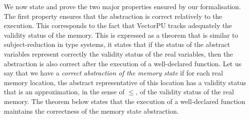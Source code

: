 \documentclass[preprint,12pt]{elsarticle}
\begin{document}
We now state and  prove the two major properties ensured by our formalisation.
The first property ensures that the abstraction is correct relatively to the 
execution. This corresponds to the fact that VectorPU tracks adequately the validity 
status of the 
memory. This is expressed as a theorem that is similar to subject-reduction in type 
systems, it states that if the status of the abstract variables represent correctly the 
validity status of the real variables, then the 
abstraction is also correct after the execution of a  well-declared function.  Let us say 
that  we have a \emph{correct abstraction of the memory state} if for each real memory 
location, the abstract representative of this location has a validity status that is an 
approximation, in the sense of $\leq$, of the validity status of the real memory. The 
theorem below states that the execution of a well-declared function maintains the 
correctness of the memory state 
abstraction. 
\end{document}

